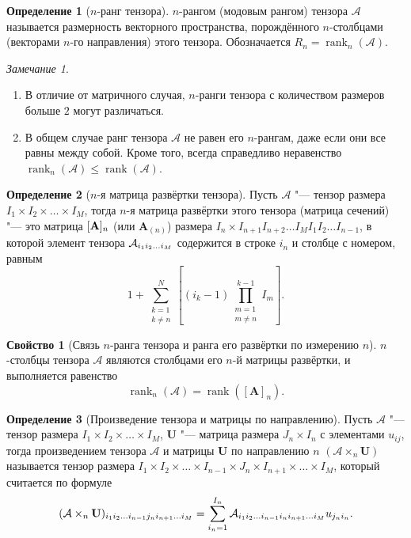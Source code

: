 \documentclass[specialist,
  substylefile = spbu.rtx,
subf,href,colorlinks=true, 12pt]{disser}
\theoremstyle{plain}
\theoremstyle{definition}
\newtheorem{definition}{Определение}[section]
\newtheorem{property}{Свойство}[section]
\theoremstyle{remark}
\newtheorem{remark}{Замечание}[section]
\begin{document}
\begin{definition}[$n$-ранг тензора]
  $n$-рангом (модовым рангом) тензора $\mathcal{A}$ называется
  размерность векторного пространства, порождённого
  $n$-столбцами (векторами $n$-го направления) этого тензора.
  Обозначается $R_n=\operatorname{rank}_{n}(\mathcal{A})$.
\end{definition}

\begin{remark}
  \begin{enumerate}
    \item В отличие от матричного случая, $n$-ранги тензора с
      количеством размеров больше $2$ могут различаться.
    \item В общем случае ранг тензора $\mathcal{A}$ не равен его
      $n$-рангам, даже если они все равны между
      собой.
      Кроме того, всегда справедливо неравенство
      $\operatorname{rank}_n(\mathcal{A})\leqslant
      \operatorname{rank}(\mathcal{A})$.
  \end{enumerate}
\end{remark}

\begin{definition}[$n$-я матрица развёртки тензора]
  Пусть $\mathcal{A}$ "--- тензор размера\linebreak $I_1\times
  I_2\times\ldots\times I_M$, тогда $n$-я матрица
  развёртки этого тензора (матрица сечений) "--- это матрица
  $[\mathbf{A}]_n$ (или $\mathbf{A}_{(n)}$)
  размера $I_n\times I_{n+1}I_{n+2}\ldots I_{M}I_{1}I_{2}\ldots I_{n-1}$,
  в которой элемент тензора $\mathcal{A}_{i_1 i_2\ldots i_M}$ содержится в
  строке $i_n$ и столбце с номером, равным
  \[
    1 + \sum_{\substack{k = 1 \\ k \ne n}}^{N} \left[(i_k - 1)
    \prod_{\substack{m=1 \\ m\ne n}}^{k-1} I_m\right].
  \]
\end{definition}

\begin{property}
  [Связь $n$-ранга тензора и ранга его развёртки по измерению
  $n$]\label{property:n-rank-unfold}
  $n$-столб\-цы тензора $\mathcal{A}$ являются столбцами его $n$-й
  матрицы развёртки, и выполняется равенство
  \[
    \operatorname{rank}_{n}(\mathcal{A})=\operatorname{rank}\left(\left[\mathbf{A}\right]_n\right).
  \]
\end{property}

\begin{definition}[Произведение тензора и матрицы по направлению]
  Пусть $\mathcal A$ "--- тензор размера $I_1\times
  I_2\times\ldots\times I_M$, $\mathbf U$
  "--- матрица размера $J_n\times I_n$ с элементами $u_{ij}$,
  тогда произведением тензора $\mathcal{A}$ и матрицы $\mathbf{U}$ по
  направлению $n$ $(\mathcal{A}\times_n \mathbf U)$ называется тензор размера
  $I_1\times I_2\times\ldots\times I_{n-1} \times J_n\times
  I_{n+1}\times \ldots\times I_M$,
  который считается по формуле
  \[
    (\mathcal{A}\times_n \mathbf U)_{i_1 i_2\ldots i_{n-1}j_n
    i_{n+1}\ldots i_M} =
    \sum_{i_n=1}^{I_n} \mathcal{A}_{i_1 i_2\ldots i_{n-1}i_n i_{n+1} \ldots
    i_M} u_{j_n i_n}.
  \]
\end{definition}
\end{document}
